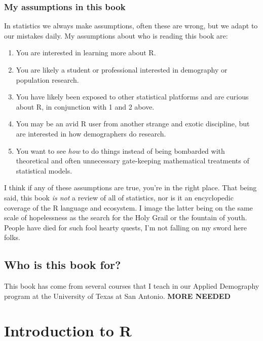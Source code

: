 \documentclass[
]{article}
\begin{document}
\hypertarget{my-assumptions-in-this-book}{%
\subsubsection{My assumptions in this book}\label{my-assumptions-in-this-book}}

In statistics we always make assumptions, often these are wrong, but we
adapt to our mistakes daily. My assumptions about who is reading this
book are:

\begin{enumerate}
\def\labelenumi{\arabic{enumi}.}
\item
  You are interested in learning more about R.
\item
  You are likely a student or professional interested in demography or
  population research.
\item
  You have likely been exposed to other statistical platforms and are
  curious about R, in conjunction with 1 and 2 above.
\item
  You may be an avid R user from another strange and exotic
  discipline, but are interested in how demographers do research.
\item
  You want to see \emph{how} to do things instead of being bombarded with
  theoretical and often unnecessary gate-keeping mathematical
  treatments of statistical models.
\end{enumerate}

I think if any of these assumptions are true, you're in the right place.
That being said, this book \emph{is not} a review of all of statistics, nor
is it an encyclopedic coverage of the R language and ecosystem. I image
the latter being on the same scale of hopelessness as the search for the
Holy Grail or the fountain of youth. People have died for such fool
hearty quests, I'm not falling on my sword here folks.

\hypertarget{who-is-this-book-for}{%
\subsection{Who is this book for?}\label{who-is-this-book-for}}

This book has come from several courses that I teach in our Applied Demography program at the University of Texas at San Antonio. \textbf{MORE NEEDED}

\hypertarget{introduction-to-r}{%
\section{Introduction to R}\label{introduction-to-r}}
\end{document}
